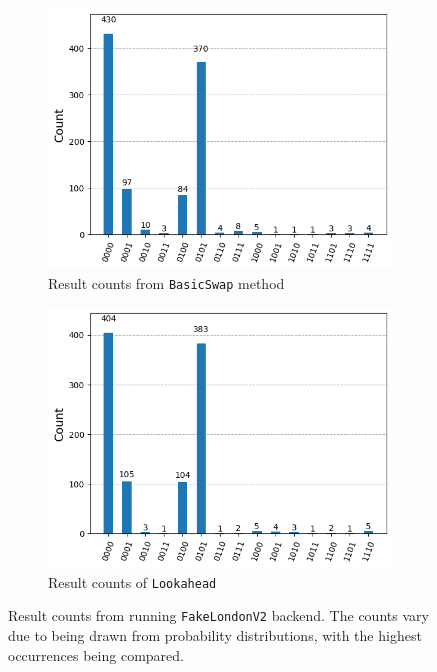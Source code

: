 \begin{figure}[htb]
    \centering
    \begin{subfigure}{0.45\linewidth}
        \includegraphics[width=\linewidth]{image/plot_basic.png}
        \caption{Result counts from \lstinline{BasicSwap} method}
        \label{fig:plot-basic}
    \end{subfigure}
    \begin{subfigure}{0.45\linewidth}
        \includegraphics[width=\linewidth]{image/plot_lookahead.png}
        \caption{Result counts of \lstinline{Lookahead}}
        \label{fig:plot-lookahead}
        \end{subfigure}
    \caption{Result counts from running \lstinline{FakeLondonV2} backend. The counts vary due to being drawn from probability distributions, with the highest occurrences being compared.}
\end{figure}